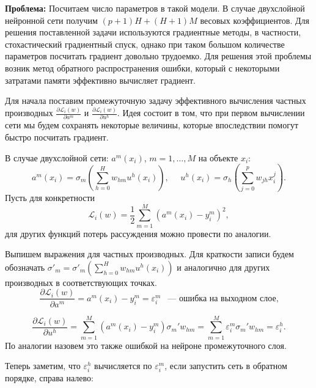 \documentclass{article}
\begin{document}
	\textbf{Проблема:} Посчитаем число параметров в такой модели. В случае двухслойной нейронной сети получим $(p+1)H+(H+1)M$ весовых коэффициентов. Для решения поставленной задачи используются градиентные методы, в частности, стохастический градиентный спуск, однако при таком большом количестве параметров посчитать градиент довольно трудоемко. Для решения этой проблемы возник метод обратного распространения ошибки, который с некоторыми затратами памяти эффективно вычисляет градиент.
	
	Для начала поставим промежуточную задачу эффективного вычисления частных производных $\frac{\partial \mathcal{L}_i(w)}{\partial a^m}$ и $\frac{\partial \mathcal{L}_i(w)}{\partial u^h}$. Идея состоит в том, что при первом вычислении сети мы будем сохранять некоторые величины, которые впоследствии помогут быстро посчитать градиент.
	
	В случае двухслойной сети: $a^m(x_i)$, $m=1,\ldots,M$ на объекте $x_i$:
	\begin{equation*}
		a^m(x_i) = \sigma_m \left(\sum_{h=0}^{H} w_{hm}  u^h(x_i)  \right), ~~~~~~
		u^h(x_i) = \sigma_h \left(\sum_{j=0}^{p} w_{jh} x_{i}^j   \right).
	\end{equation*}
	Пусть для конкретности
	\begin{equation*}
		\mathcal{L}_i(w) = \frac{1}{2} \sum_{m=1}^{M}(a^m(x_i) - y^m_i)^2,
	\end{equation*}
	для других функций потерь рассуждения можно провести по аналогии.
	
	Выпишем выражения для частных производных. Для краткости записи будем обозначать $\sigma'_m = \sigma'_m (\sum\limits_{h=0}^H w_{hm} u^h(x_i))$ и аналогично для других производных в соответствующих точках.
	\begin{equation*}
		\frac{\partial \mathcal{L}_i(w)}{\partial a^m} = a^m(x_i) - y_i^m = \varepsilon^m_i ~~\text{ --- ошибка на выходном слое,}
	\end{equation*}
	
	\begin{equation*}
		\frac{\partial \mathcal{L}_i(w)}{\partial u^h} = \sum \limits_{m=1}^M (a^m(x_i) - y_i^m) \sigma_m' w_{hm} = \sum \limits_{m=1}^M \varepsilon^m_i \sigma_m' w_{hm} = \varepsilon^h_i.
	\end{equation*}
	По аналогии назовем это также ошибкой на нейроне промежуточного слоя.
	
	Теперь заметим, что $\varepsilon_i^h$ вычисляется по $\varepsilon_i^m$, если запустить сеть в обратном порядке, справа налево:
	
\end{document}
